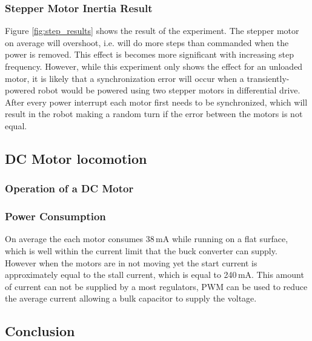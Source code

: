 \subsubsection{Stepper Motor Inertia Result}

Figure \ref{fig:step_results} shows the result of the experiment.
The stepper motor on average will overshoot, i.e. will do more steps than commanded when the power is removed.
This effect is becomes more significant with increasing step frequency.
However, while this experiment only shows the effect for an unloaded motor, it is likely that a synchronization error will occur when a transiently-powered robot would be powered using two stepper motors in differential drive.
After every power interrupt each motor first needs to be synchronized, which will result in the robot making a random turn if the error between the motors is not equal.

\subsection{DC Motor locomotion}




\subsubsection{Operation of a DC Motor}

\subsubsection{Power Consumption}

On average the each motor consumes 38\,mA while running on a flat surface, which is well within the current limit that the buck converter can supply.
However when the motors are in not moving yet the start current is approximately equal to the stall current, which is equal to 240\,mA.
This amount of current can not be supplied by a most regulators, PWM can be used to reduce the average current allowing a bulk capacitor to supply the voltage.


\subsection{Conclusion}

